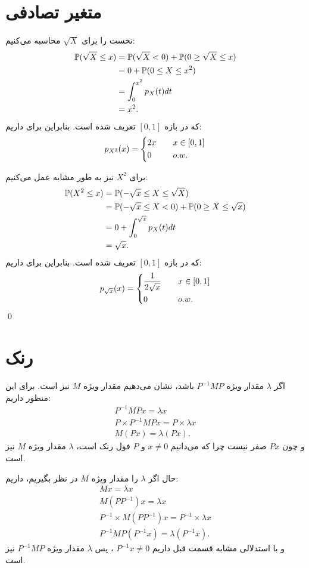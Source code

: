 \documentclass[a4paper, 11pt]{article}
\begin{document}
\section{متغیر تصادفی}
نخست
را برای $\sqrt{X}$ محاسبه می‌کنیم:
\[
\begin{aligned}
	{\mathbb P}(\sqrt{X} \le x)	&= {\mathbb P}(\sqrt{X} < 0) + {\mathbb P}( 0 \ge \sqrt{X} \le x) \\
							&= 0 + {\mathbb P}(0 \le X \le x^2) \\
							&= \int_0^{x^2} p_X(t) dt\\
							&= x^2.
\end{aligned}
\]
که در بازه
$[0,1]$
تعریف شده است.
بنابراین برای
داریم:
\[
p_{X^2}(x) =
\begin{dcases}
	2x	&\quad  x\in [0,1]\\
	0	&\quad o.w.	
\end{dcases}
\]

برای $X^2$ نیز به طور مشابه عمل می‌کنیم:
\[
\begin{aligned}
	{\mathbb P}(X^2 \le x)	&= {\mathbb P}(-\sqrt{x} \le X \le \sqrt{X}) \\
						&= {\mathbb P}(-\sqrt{x} \le X < 0) + {\mathbb P}(0 \ge X \le \sqrt{x})\\
						&= 0 + \int_0^{\sqrt{x}} p_X(t)dt \\
						&= \sqrt{x}.
\end{aligned}
\]
که در بازه
$[0,1]$
تعریف شده است.
بنابراین برای 
داریم:
\[
p_{\sqrt{x}}(x) = 
\begin{dcases}
	\frac{1}{2\sqrt{x}}	&\quad x \in [0,1]\\
	 0					&\quad o.w.
\end{dcases}
\]
\qed
\section{رنک}
اگر $\lambda$ مقدار ویژه
$P^{-1}MP$
باشد، نشان می‌دهیم مقدار ویژه $M$ نیز است. برای این منظور داریم:
\[
\begin{gathered}
	P^{-1}MP x = \lambda x\\
	P \times P^{-1}MP x = P \times \lambda x\\
	M (Px) = \lambda (Px).
\end{gathered}
\]
و چون $Px$ صفر نیست چرا که می‌دانیم
$x \ne 0$
و $P$ فول رنک است، $\lambda$ مقدار ویژه $M$ نیز است.

حال اگر $\lambda$ را مقدار ویژه $M$ در نظر بگیریم، داریم:
\[
\begin{gathered}
	M x = \lambda x \\
	M(PP^{-1}) x = \lambda x\\
	P^{-1} \times M(PP^{-1}) x = P^{-1} \times \lambda x\\
	P^{-1}MP (P^{-1}x) = \lambda (P^{-1}x).
\end{gathered}
\]
و با استدلالی مشابه قسمت قبل داریم
$P^{-1}x \ne 0$
، پس $\lambda$ مقدار ویژه
$P^{-1}MP$
نیز است.
\end{document}
